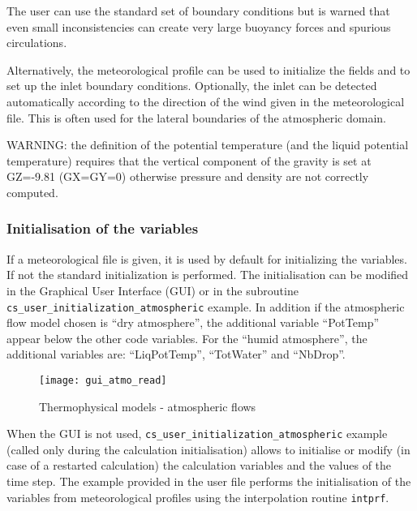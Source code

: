 {The user can  use the standard set of \CS boundary conditions but is warned that even small
inconsistencies can create very large buoyancy forces and spurious circulations.

Alternatively, the meteorological profile can be used to initialize the fields and to set up the inlet boundary
conditions. Optionally, the inlet can be detected automatically according to the direction of the wind given
in the meteorological file. This is often used for the lateral boundaries of the atmospheric domain.

WARNING: the definition of the potential temperature (and the liquid potential temperature) requires that the
vertical component of the gravity is set at GZ=-9.81 (GX=GY=0) otherwise pressure and density are not
correctly computed.

\subsubsection{Initialisation of the variables}

If a meteorological file is given, it is used by default for initializing the
variables. If not the standard initialization is performed.
The initialisation can be modified in the Graphical User Interface (GUI)
 or in the subroutine \texttt{cs\_user\_initialization\_atmospheric} example.
In addition if the atmospheric flow model chosen is
  ``dry atmosphere'',  the additional variable ``PotTemp'' appear below the other
code variables. For the ``humid atmosphere'', the additional variables are:
``LiqPotTemp'', ``TotWater'' and ``NbDrop''.

\begin{figure}[ht]
\begin{center}
\texttt{[image: gui\_atmo\_read]}
\caption{Thermophysical models - atmospheric flows}
\label{fig:Ini-atmo}
\end{center}
\end{figure}

When the GUI is not used, \texttt{cs\_user\_initialization\_atmospheric} example (called only during the calculation
 initialisation) allows to initialise or modify
(in case of a restarted calculation) the calculation variables and the values of
the time step.
The example provided in the user file performs the initialisation of the
variables from meteorological profiles using the interpolation routine \texttt{intprf}.

}
